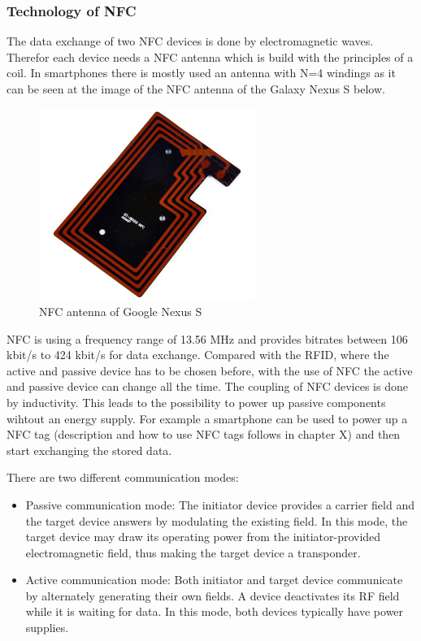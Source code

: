 \documentclass[11pt]{article}
\begin{document}
\subsubsection{Technology of NFC}

The data exchange of two NFC devices is done by electromagnetic waves. Therefor each device needs a NFC antenna which is build with the principles of a coil. In smartphones there is mostly used an antenna with N=4 windings as it can be seen at the image of the NFC antenna of the Galaxy Nexus S below.

\begin{figure}[H]

 \centering
 \includegraphics [width=7cm]{nexus-s-nfc-antenna.jpg} %
 \caption{NFC antenna of Google Nexus S\cite{cite3}}
\end{figure}


NFC is using a frequency range of 13.56 MHz and provides bitrates between 106 kbit/s to 424 kbit/s for data exchange. Compared with the RFID, where the active and passive device has to be chosen before, with the use of NFC the active and passive device can change all the time.
The coupling of NFC devices is done by inductivity. This leads to the possibility to power up passive components wihtout an energy supply. For example a smartphone can be used to power up a NFC tag (description and how to use NFC tags follows in chapter X) and then start exchanging the stored data.

There are two different communication modes:

\begin{itemize} 
\item Passive communication mode: The initiator device provides a carrier field and the target device answers by modulating the existing field. In this mode, the target device may draw its operating power from the initiator-provided electromagnetic field, thus making the target device a transponder.
\item Active communication mode: Both initiator and target device communicate by alternately generating their own fields. A device deactivates its RF field while it is waiting for data. In this mode, both devices typically have power supplies.
\end{itemize} 
\end{document}
